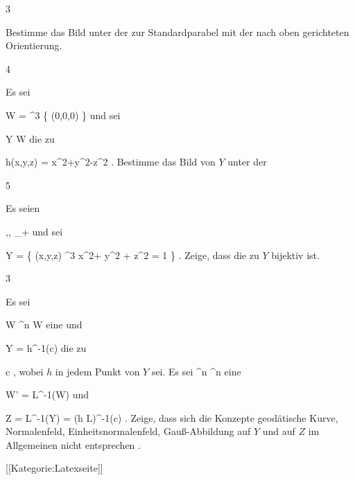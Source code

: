 {3}
{

Bestimme das Bild unter der
zur Standardparabel mit der nach oben gerichteten Orientierung.

}
{} {}

{4}
{

Es sei

\mavergleichskette
{\vergleichskette
{ W
}
{ = }{ \R^3 \setminus \{ (0,0,0) \}
}
{  }{
}
{    }{
}
{   }{
}
}
{}{}{}
und sei

\mavergleichskette
{\vergleichskette
{ Y
}
{ \subseteq }{ W
}
{  }{
}
{    }{
}
{   }{
}
}
{}{}{}
die
zu

\mavergleichskettedisp
{\vergleichskette
{ h(x,y,z)
}
{ =} { x^2+y^2-z^2
}
{ } {
}
{ } {
}
{ } {
}
}
{}{}{.}
Bestimme das Bild von $Y$
 {} {}
unter der

}
{} {}

{5}
{

Es seien

\mavergleichskette
{\vergleichskette
{ \alpha,\beta, \gamma
}
{ \in }{ \R_+
}
{  }{
}
{    }{
}
{   }{
}
}
{}{}{}
und sei

\mavergleichskettedisp
{\vergleichskette
{ Y
}
{ =} { \left\{ (x,y,z) \in \R^3  \mid   \alpha x^2+ \beta y^2 + \gamma z^2 = 1        \right\}
}
{ } {
}
{ } {
}
{ } {
}
}
{}{}{.}
Zeige, dass die
zu $Y$ bijektiv ist.

}
{} {}

{3}
{

Es sei

\mavergleichskette
{\vergleichskette
{ W
}
{ \subseteq }{ \R^n
}
{  }{
}
{    }{
}
{   }{
}
}
{}{}{}
 { W } { \R
} {}
eine
und

\mavergleichskette
{\vergleichskette
{ Y
}
{ = }{ h^{-1}(c)
}
{  }{
}
{    }{
}
{   }{
}
}
{}{}{}
die
zu

\mavergleichskette
{\vergleichskette
{ c
}
{ \in }{ \R
}
{  }{
}
{    }{
}
{   }{
}
}
{}{}{,}
wobei $h$ in jedem Punkt von $Y$
sei. Es sei
 {\R^n } { \R^n
} {}
eine

\mavergleichskette
{\vergleichskette
{ W'
}
{ = }{ L^{-1}(W)
}
{  }{
}
{    }{
}
{   }{
}
}
{}{}{}
und

\mavergleichskettedisp
{\vergleichskette
{ Z
}
{ =} { L^{-1}(Y)
}
{ =} { (h \circ L)^{-1}(c)
}
{ } {
}
{ } {
}
}
{}{}{.}
Zeige, dass sich die Konzepte geodätische Kurve, Normalenfeld, Einheitsnormalenfeld, Gauß-Abbildung auf $Y$ und auf $Z$ im Allgemeinen nicht entsprechen
 {} {.}

}
{} {}

 [[Kategorie:Latexseite]]
